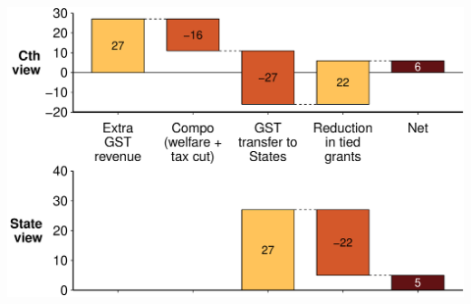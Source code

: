 \documentclass[a4paper,landscape]{article}\usepackage[]{graphicx}\usepackage[]{color}
\newenvironment{knitrout}{}{} %
\begin{document}
\begin{knitrout}
\color{fgcolor}
\includegraphics[width=11.000in,height=7.00in]{figure/cowplot-1} 

\end{knitrout}
\end{document}
